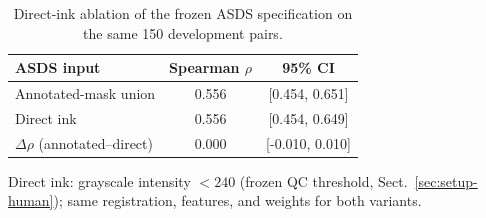 \begin{table}[t]
\caption{Direct-ink ablation of the frozen ASDS specification on the same 150
development pairs.}
\label{tab:direct-ink-asds}
\centering
\begin{tabular}{@{}lcc@{}}
\toprule
ASDS input & Spearman $\rho$ & 95\% CI \\
\midrule
Annotated-mask union & 0.556 & [0.454, 0.651] \\
Direct ink & 0.556 & [0.454, 0.649] \\
\midrule
$\Delta\rho$ (annotated--direct) & 0.000 & [-0.010, 0.010] \\
\bottomrule
\end{tabular}
\parbox{0.86\columnwidth}{\footnotesize\raggedright
Direct ink: grayscale intensity $<240$ (frozen QC threshold,
Sect.~\ref{sec:setup-human}); same registration, features, and weights for
both variants.}
\end{table}
